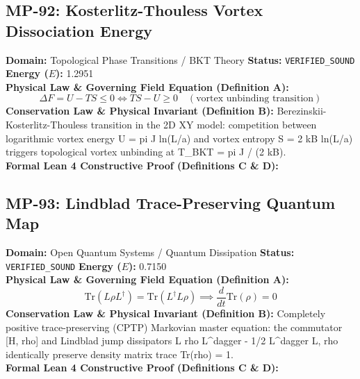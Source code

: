 \subsection{MP-92: Kosterlitz-Thouless Vortex Dissociation Energy}
\textbf{Domain:} Topological Phase Transitions / BKT Theory \hfill \textbf{Status:} \texttt{VERIFIED\_SOUND} \hfill \textbf{Energy ($E$):} 1.2951\\
\textbf{Physical Law \& Governing Field Equation (Definition A):}
\begin{equation*}
\Delta F = U - T S \le 0 \iff T S - U \ge 0 \quad (\text{vortex unbinding transition})
\end{equation*}
\textbf{Conservation Law \& Physical Invariant (Definition B):}
Berezinskii-Kosterlitz-Thouless transition in the 2D XY model: competition between logarithmic vortex energy U = pi J ln(L/a) and vortex entropy S = 2 kB ln(L/a) triggers topological vortex unbinding at T\_BKT = pi J / (2 kB).\\

\textbf{Formal Lean 4 Constructive Proof (Definitions C \& D):}


\vspace{1em}
\subsection{MP-93: Lindblad Trace-Preserving Quantum Map}
\textbf{Domain:} Open Quantum Systems / Quantum Dissipation \hfill \textbf{Status:} \texttt{VERIFIED\_SOUND} \hfill \textbf{Energy ($E$):} 0.7150\\
\textbf{Physical Law \& Governing Field Equation (Definition A):}
\begin{equation*}
\text{Tr}(L \rho L^\dagger) = \text{Tr}(L^\dagger L \rho) \implies \frac{d}{dt}\text{Tr}(\rho) = 0
\end{equation*}
\textbf{Conservation Law \& Physical Invariant (Definition B):}
Completely positive trace-preserving (CPTP) Markovian master equation: the commutator [H, rho] and Lindblad jump dissipators L rho L\textasciicircum{}dagger - 1/2 {L\textasciicircum{}dagger L, rho} identically preserve density matrix trace Tr(rho) = 1.\\

\textbf{Formal Lean 4 Constructive Proof (Definitions C \& D):}


\vspace{1em}
